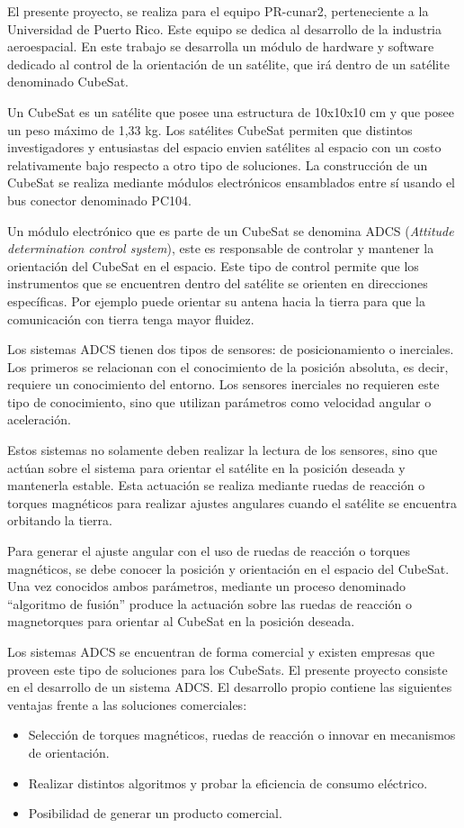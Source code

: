 \documentclass[
11pt, %
]{charter}
\begin{document}
El presente proyecto, se realiza para el equipo PR-cunar2, perteneciente a la Universidad de Puerto Rico. Este equipo se dedica al desarrollo de la industria aeroespacial. En este trabajo se desarrolla un módulo de hardware y software dedicado al control de la orientación de un satélite, que irá dentro de un satélite denominado CubeSat.

Un CubeSat es un satélite que posee una estructura de 10x10x10 cm y que posee un peso máximo de 1,33 kg. Los satélites CubeSat permiten que distintos investigadores y entusiastas del espacio envien satélites al espacio con un costo relativamente bajo respecto a otro tipo de soluciones. La construcción de un  CubeSat se realiza mediante módulos electrónicos ensamblados entre sí usando el bus conector denominado PC104. 

Un módulo electrónico que es parte de un CubeSat se denomina ADCS (\textit{Attitude determination control system}), este es responsable de controlar y mantener la orientación del CubeSat en el espacio. Este tipo de control  permite que los instrumentos que se encuentren dentro del satélite se orienten en direcciones específicas.  Por ejemplo puede orientar su antena hacia la tierra para que la comunicación con tierra tenga mayor fluidez. 

Los sistemas ADCS tienen dos tipos de sensores: de posicionamiento o inerciales. Los primeros se relacionan con el conocimiento de la posición absoluta, es decir, requiere un conocimiento del entorno. Los sensores inerciales no requieren este tipo de conocimiento, sino que utilizan parámetros como velocidad angular o aceleración. 

Estos sistemas no solamente deben realizar la lectura de los sensores, sino que actúan sobre el sistema para orientar el satélite en la posición deseada y mantenerla estable. Esta actuación se realiza mediante ruedas de reacción o torques magnéticos para realizar ajustes angulares cuando el satélite se encuentra orbitando la tierra.

Para generar el ajuste angular con el uso de ruedas de reacción o torques magnéticos, se debe  conocer la posición y orientación en el espacio del CubeSat. Una vez conocidos ambos parámetros, mediante un proceso denominado “algoritmo de fusión” produce la actuación sobre las ruedas de reacción o magnetorques para orientar al CubeSat en la posición deseada.

 Los sistemas ADCS se encuentran de forma comercial y  existen empresas que proveen este tipo de soluciones para los CubeSats. El presente proyecto consiste en el desarrollo de un sistema ADCS. El desarrollo propio contiene las siguientes ventajas frente a las soluciones comerciales: 
\begin{itemize}
	\item Selección de torques magnéticos, ruedas de reacción o innovar en mecanismos de orientación. 
	\item Realizar distintos algoritmos y probar la eficiencia de consumo eléctrico. 
	\item Posibilidad de generar un producto comercial. 
\end{itemize}
\end{document}
